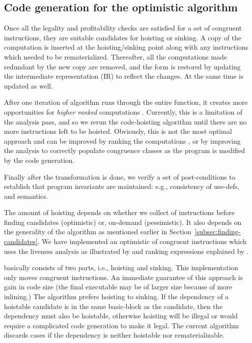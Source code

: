 \documentclass[sigplan,10pt,review,anonymous]{acmart}\settopmatter{printfolios=true,printccs=false,printacmref=false}
\begin{document}
\subsection{Code generation for the optimistic \gcm{} algorithm}
\label{subsec:optimistic}
Once all the legality and profitability checks are satisfied for a set of
congruent instructions, they are suitable candidates for hoisting or sinking. A
copy of the computation is inserted at the hoisting/sinking point along with any
instructions which needed to be rematerialized. Thereafter, all the computations
made redundant by the new copy are removed, and the \SSA{} form is restored by
updating the intermediate representation (IR) to reflect the changes. At the
same time \MemorySSA{} is updated as well.

After one iteration of algorithm runs through the entire function, it creates
more opportunities for \emph{higher ranked} computations
\cite{rosen1988global}. Currently, this is a limitation of the \GVN{} analysis
pass, and so we rerun the code-hoisting algorithm until there are no more
instructions left to be hoisted.  Obviously, this is not the most optimal
approach and can be improved by ranking the computations \cite{rosen1988global},
or by improving the \GVN{} analysis to correctly populate congruence classes as
the program is modified by the code generation.

Finally after the transformation is done, we verify a set of post-conditions to
establish that program invariants are maintained: e.g., consistency of use-defs,
and \SSA{} semantics.

The amount of hoisting depends on whether we collect \GVN{} of instructions
before finding candidates (optimistic) or, on-demand (pessimistic). It also
depends on the generality of the \GVN{} algorithm as mentioned earlier in
Section~\ref{subsec:finding-candidates}. We have implemented an optimistic
\gcm{} of congruent instructions which uses the liveness analysis as
illustrated by \citet{das2012} and ranking expressions explained by
\citet{rosen1988global}.

\GCM{} basically consists of two parts, i.e., hoisting and sinking. This
implementation only moves congruent instructions. An immediate guarantee of this
approach is gain in code size (the final executable may be of larger size
because of more inlining.) The algorithm prefers hoisting to sinking. If the
dependency of a hoistable candidate is in the same basic-block as the candidate,
then the dependency must also be hoistable, otherwise hoisting will be illegal or
would require a complicated code generation to make it legal. The current
algorithm discards cases if the dependency is neither hoistable nor
rematerializable.
\end{document}
